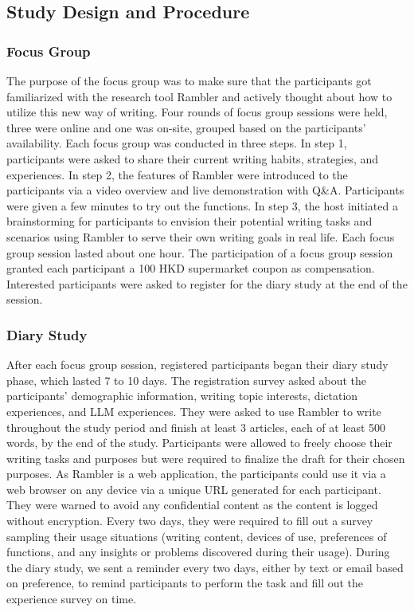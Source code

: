 \subsection{Study Design and Procedure}

\subsubsection{Focus Group}
The purpose of the focus group was to make sure that the participants got familiarized with the research tool Rambler and actively thought about how to utilize this new way of writing. Four rounds of focus group sessions were held, three were online and one was on-site, grouped based on the participants' availability. Each focus group was conducted in three steps. In step 1, participants were asked to share their current writing habits, strategies, and experiences. In step 2, the features of Rambler were introduced to the participants via a video overview and live demonstration with Q\&A. Participants were given a few minutes to try out the functions. In step 3, the host initiated a brainstorming for participants to envision their potential writing tasks and scenarios using Rambler to serve their own writing goals in real life. Each focus group session lasted about one hour. The participation of a focus group session granted each participant a 100 HKD supermarket coupon as compensation. Interested participants were asked to register for the diary study at the end of the session. 

\subsubsection{Diary Study}
After each focus group session, registered participants began their diary study phase, which lasted 7 to 10 days. The registration survey asked about the participants' demographic information, writing topic interests, dictation experiences, and LLM experiences. They were asked to use Rambler to write throughout the study period and finish at least 3 articles, each of at least 500 words, by the end of the study.
Participants were allowed to freely choose their writing tasks and purposes but were required to finalize the draft for their chosen purposes. As Rambler is a web application, the participants could use it via a web browser on any device via a unique URL generated for each participant. They were warned to avoid any confidential content as the content is logged without encryption. 
Every two days, they were required to fill out a survey sampling their usage situations (writing content, devices of use, preferences of functions, and any insights or problems discovered during their usage). During the diary study, we sent a reminder every two days, either by text or email based on preference, to remind participants to perform the task 
and fill out the experience survey on time.

